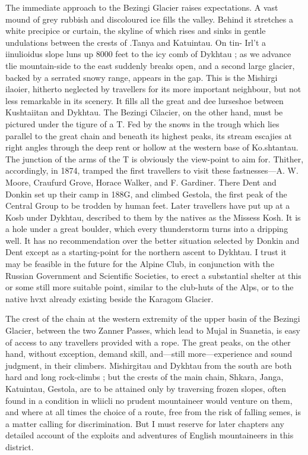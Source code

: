 \documentclass[25pt, a4paper]{article}
\begin{document}
	The immediate approach to the Bezingi Glacier raises expectations. A vast mound of grey rubbish and discoloured ice fills the valley. Behind it stretches a white precipice or curtain, the skyline of which rises and sinks in gentle undulations between the crests of .Tanya and Katuintau. On tin- Irl't a iinulioidus slope luns up 8000 feet to the icy comb of Dykhtau ; as we advance tlie mountain-side to the east suddenly breaks open, and a second large glacier, backed by a serrated snowy range, appears in the gap. This is the Mishirgi ilaoier, hitherto neglected by travellers for its more important neighbour, but not less remarkable in its scenery. It fills all the great and dee lurseshoe between Kushtaiitan and Dykhtau. The Bezingi Cilacier, on the other hand, must be pictured under the tigure of a T. Fed by the snows in the trough which lies parallel to the great chain and beneath its highest peaks, its stream escajies at right angles through the deep rent or hollow at the western base of Ko.shtantau. The junction of the arms of the T is obviously the view-point to aim for. Thither, accordingly, in 1874, tramped the first travellers to visit these fastnesses—A. W. Moore, Craufurd Grove, Horace Walker, and F. Gardiner. There Dent and Donkin set up their camp in 188G, and climbed Gestola, the first peak of the Central Group to be trodden by human feet. Later travellers have put up at a Kosb under Dykhtau, described to them by the natives as the Missess Kosh. It is a hole under a great boulder, which every thunderstorm turns into a dripping well. It has no recommendation over the better situation selected by Donkin and Dent except as a starting-point for the northern ascent to Dykhtau. I trust it may be feasible in the future for the Alpine Club, in conjunction with the Russian Government and Scientific Societies, to erect a substantial shelter at this or some still more suitable point, similar to the club-huts of the Alps, or to the native hvxt already existing beside the Karagom Glacier.

The crest of the chain at the western extremity of the upper basin of the Bezingi Glacier, between the two Zanner Passes, which lead to Mujal in Suanetia, is easy of access to any travellers provided with a rope. The great peaks, on the other hand, without exception, demand skill, and—still more—experience and sound judgment, in their climbers. Mishirgitau and Dykhtau from the south are both hard and long rock-climbs ; but the crests of the main chain, Shkara, Janga, Katuintau, Gestola, are to be attained only by traversing frozen slopes, often found in a condition in wliicli no prudent mountaineer would venture on them, and where at all times the choice of a route, free from the risk of falling semes, is a matter calling for discrimination. But I must reserve for later chapters any detailed account of the exploits and adventures of English mountaineers in this district.
\end{document}
